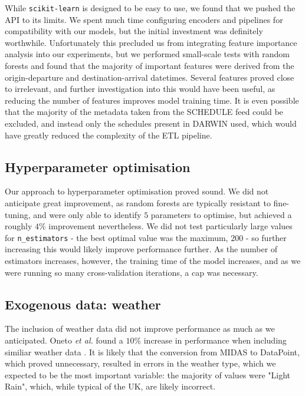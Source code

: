 \documentclass[12pt,a4paper]{article}
\begin{document}
While \verb|scikit-learn| is designed to be easy to use, we found that we pushed the API to its limits. We spent much time configuring encoders and pipelines for compatibility with our models, but the initial investment was definitely worthwhile. Unfortunately this precluded us from integrating feature importance analysis into our experiments, but we performed small-scale tests with random forests and found that the majority of important features were derived from the origin-departure and destination-arrival datetimes. Several features proved close to irrelevant, and further investigation into this would have been useful, as reducing the number of features improves model training time. It is even possible that the majority of the metadata taken from the SCHEDULE feed could be excluded, and instead only the schedules present in DARWIN used, which would have greatly reduced the complexity of the ETL pipeline.

\subsection{Hyperparameter optimisation}

Our approach to hyperparameter optimisation proved sound. We did not anticipate great improvement, as random forests are typically resistant to fine-tuning, and were only able to identify $5$ parameters to optimise, but achieved a roughly $4\%$ improvement nevertheless. We did not test particularly large values for \verb|n_estimators| - the best optimal value was the maximum, $200$ - so further increasing this would likely improve performance further. As the number of estimators increases, however, the training time of the model increases, and as we were running so many cross-validation iterations, a cap was necessary. 

\subsection{Exogenous data: weather}

The inclusion of weather data did not improve performance as much as we anticipated. Oneto \textit{et al.} found a $10\%$ increase in performance when including similiar weather data \cite{oneto_et_al_2016}. It is likely that the conversion from MIDAS to DataPoint, which proved unnecessary, resulted in errors in the weather type, which we expected to be the most important variable: the majority of values were "Light Rain", which, while typical of the UK, are likely incorrect.
\end{document}
